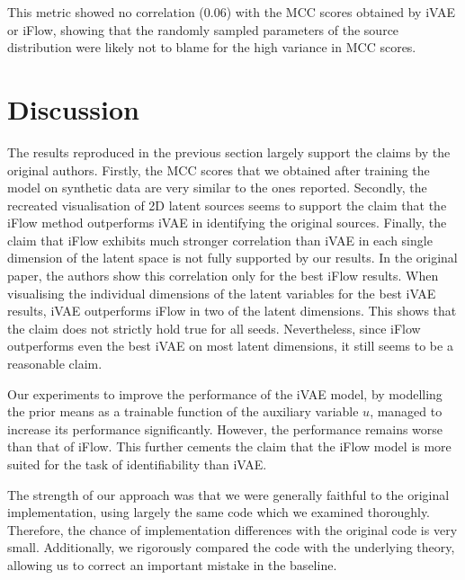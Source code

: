 This metric showed no correlation (0.06) with the MCC scores obtained by iVAE or iFlow, showing that the randomly sampled parameters of the source distribution were likely not to blame for the high variance in MCC scores.

\section{Discussion}
The results reproduced in the previous section largely support the claims by the original authors. Firstly, the MCC scores that we obtained after training the model on synthetic data are very similar to the ones reported. Secondly, the recreated visualisation of 2D latent sources seems to support the claim that the iFlow method outperforms iVAE in identifying the original sources. Finally, the claim that iFlow exhibits much stronger correlation than iVAE in each single dimension of the latent space is not fully supported by our results. In the original paper, the authors show this correlation only for the best iFlow results. When visualising the individual dimensions of the latent variables for the best iVAE results, iVAE outperforms iFlow in two of the latent dimensions. This shows that the claim does not strictly hold true for all seeds. Nevertheless, since iFlow outperforms even the best iVAE on most latent dimensions, it still seems to be a reasonable claim.

Our experiments to improve the performance of the iVAE model, by modelling the prior means as a trainable function of the auxiliary variable $u$, managed to increase its performance significantly. However, the performance remains worse than that of iFlow. This further cements the claim that the iFlow model is more suited for the task of identifiability than iVAE.

The strength of our approach was that we were generally faithful to the original implementation, using largely the same code which we examined thoroughly. Therefore, the chance of implementation differences with the original code is very small. Additionally, we rigorously compared the code with the underlying theory, allowing us to correct an important mistake in the baseline.

